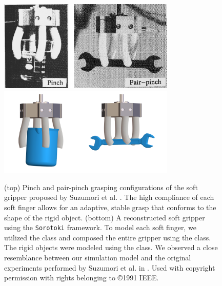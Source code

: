 \begin{figure}[!t]
    \centering
    \includegraphics*[width=0.75\textwidth]{./pdf/thesis-figure-6-26-1.pdf}
    \includegraphics*[width=0.75\textwidth]{./pdf/thesis-figure-6-26-2.pdf}
    \caption{\small (top) Pinch and pair-pinch grasping configurations of the soft gripper proposed by Suzumori et al. \cite{Suzumori1992, Suzumori1991}. The high compliance of each soft finger allows for an adaptive, stable grasp that conforms to the shape of the rigid object. (bottom) A reconstructed soft gripper using the \texttt{Sorotoki} framework. To model each soft finger, we utilized the  class and composed the entire gripper using the  class. The rigid objects were modeled using the  class. We observed a close resemblance between our simulation model and the original experiments performed by Suzumori et al. in \cite{Suzumori1991, Suzumori1992}. Used with copyright permission with rights belonging to \copyright1991 IEEE.}
    \label{fig:C5:suzumori_gripper_grasp}
    \vspace{-3mm}
\end{figure}

